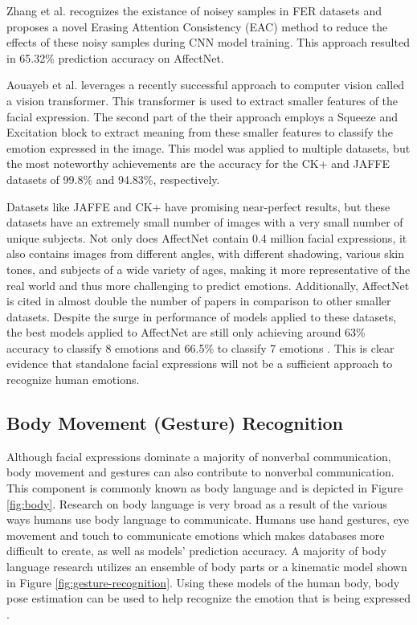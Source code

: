     Zhang et al. \cite{zhang_2022} recognizes the existance of noisey samples in FER datasets and proposes a novel Erasing Attention Consistency (EAC) method to reduce the effects of these noisy samples during CNN model training. This approach resulted in 65.32\% prediction accuracy on AffectNet. 
    
    Aouayeb et al. \cite{aouayeb-2021} leverages a recently successful approach to computer vision called a vision transformer. This transformer is used to extract smaller  features of the facial expression. The second part of the their approach employs a Squeeze and Excitation block to extract meaning from these smaller features to classify the emotion expressed in the image. This model was applied to multiple datasets, but the most noteworthy achievements are the accuracy for the CK+ and JAFFE datasets of 99.8\% and 94.83\%, respectively.    

    Datasets like JAFFE and CK+ have promising near-perfect results, but these datasets have an extremely small number of images with a very small number of unique subjects. Not only does AffectNet contain 0.4 million facial expressions, it also contains images from different angles, with different shadowing, various skin tones, and subjects of a wide variety of ages, making it more representative of the real world and thus more challenging to predict emotions. Additionally, AffectNet is cited in almost double the number of papers in comparison to other smaller datasets. Despite the surge in performance of models applied to these datasets, the best models applied to AffectNet are still only achieving around 63\% accuracy \cite{savchenko-2022} to classify 8 emotions and 66.5\% to classify 7 emotions \cite{antoniadis_exploiting_2021}. This is clear evidence that standalone facial expressions will not be a sufficient approach to recognize human emotions. 


\subsection{Body Movement (Gesture) Recognition}
    Although facial expressions dominate a majority of nonverbal communication, body movement and gestures can also contribute to nonverbal communication. This component is commonly known as body language and is depicted in Figure \ref{fig:body}. Research on body language is very broad as a result of the various ways humans use body language to communicate. Humans use hand gestures, eye movement and touch to communicate emotions which makes databases more difficult to create, as well as models' prediction accuracy. A majority of body language research utilizes an ensemble of body parts or a kinematic model shown in Figure \ref{fig:gesture-recognition}. Using these models of the human body, body pose estimation can be used to help recognize the emotion that is being expressed \cite{noroozi-2021}.   
    
